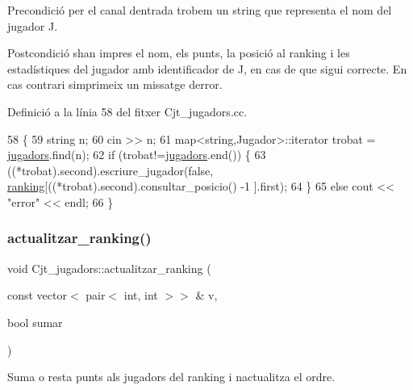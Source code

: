 \begin{DoxyPrecond}{Precondició}
per el canal d\textquotesingle{}entrada trobem un string que representa el nom del jugador J. 
\end{DoxyPrecond}
\begin{DoxyPostcond}{Postcondició}
s\textquotesingle{}han impres el nom, els punts, la posició al ranking i les estadístiques del jugador amb identificador de J, en cas de que sigui correcte. En cas contrari s\textquotesingle{}imprimeix un missatge d\textquotesingle{}error. 
\end{DoxyPostcond}


Definició a la línia 58 del fitxer Cjt\+\_\+jugadors.\+cc.


\begin{DoxyCode}
58                                      \{
59     \textcolor{keywordtype}{string} n;
60     cin >> n;
61     map<string,Jugador>::iterator trobat = \mbox{\hyperlink{class_cjt__jugadors_a9a7fd899cca7f3c126120c8e7b4719d4}{jugadors}}.find(n);
62     \textcolor{keywordflow}{if} (trobat!=\mbox{\hyperlink{class_cjt__jugadors_a9a7fd899cca7f3c126120c8e7b4719d4}{jugadors}}.end()) \{
63         ((*trobat).second).escriure\_jugador(\textcolor{keyword}{false}, \mbox{\hyperlink{class_cjt__jugadors_af9f7e71820fb657bf489ce72a31e8034}{ranking}}[((*trobat).second).consultar\_posicio() -1
      ].first);
64     \}
65     \textcolor{keywordflow}{else} cout << \textcolor{stringliteral}{"error"} << endl;
66 \}
\end{DoxyCode}
\mbox{\label{class_cjt__jugadors_a5e12a36a7049121aef6a5cb46e6528ad}} 
\subsubsection{\texorpdfstring{actualitzar\+\_\+ranking()}{actualitzar\_ranking()}}
{\footnotesize\ttfamily void Cjt\+\_\+jugadors\+::actualitzar\+\_\+ranking (\begin{DoxyParamCaption}\item[{const vector$<$ pair$<$ int, int $>$$>$ \&}]{v,  }\item[{bool}]{sumar }\end{DoxyParamCaption})}



Suma o resta punts als jugadors del ranking i n\textquotesingle{}actualitza el ordre. 

